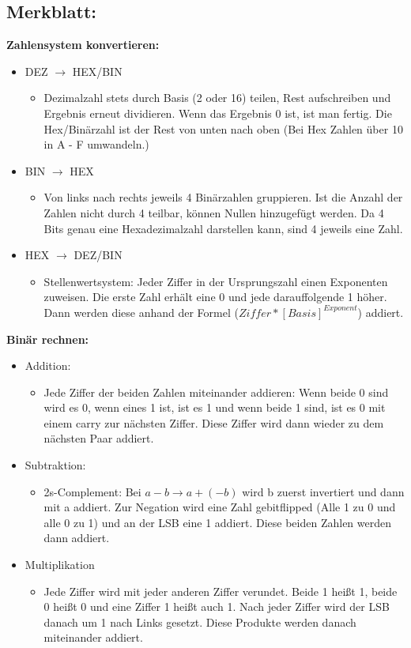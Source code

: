 \documentclass{article}
\begin{document}
		\subsection{Merkblatt:}
		\textbf{Zahlensystem konvertieren:}
		\begin{itemize}
			\item{DEZ $\to$ HEX/BIN}
			\begin{itemize}
				\item{Dezimalzahl stets durch Basis (2 oder 16) teilen, Rest aufschreiben und Ergebnis erneut dividieren. Wenn das Ergebnis 0 ist, ist man fertig. Die Hex/Binärzahl ist der Rest von unten nach oben (Bei Hex Zahlen über 10 in A - F umwandeln.)}
			\end{itemize}
			\item{BIN $\to$ HEX}
			\begin{itemize}
				\item{Von links nach rechts jeweils 4 Binärzahlen gruppieren. Ist die Anzahl der Zahlen nicht durch 4 teilbar, können Nullen hinzugefügt werden. Da 4 Bits genau eine Hexadezimalzahl darstellen kann, sind 4 jeweils eine Zahl.}
			\end{itemize}
			\item{HEX $\to$ DEZ/BIN}
			\begin{itemize}
				\item{Stellenwertsystem: Jeder Ziffer in der Ursprungszahl einen Exponenten zuweisen. Die erste Zahl erhält eine 0 und jede darauffolgende 1 höher. Dann werden diese anhand der Formel ($Ziffer * [Basis]^{Exponent}$) addiert.}
			\end{itemize}
		\end{itemize}
		\textbf{Binär rechnen:}
		\begin{itemize}
			\item{Addition:}
			\begin{itemize}
				\item{Jede Ziffer der beiden Zahlen miteinander addieren: Wenn beide 0 sind wird es 0, wenn eines 1 ist, ist es 1 und wenn beide 1 sind, ist es 0 mit einem carry zur nächsten Ziffer. Diese Ziffer wird dann wieder zu dem nächsten Paar addiert.}
			\end{itemize}
			\item{Subtraktion:}
			\begin{itemize}
				\item{2s-Complement: Bei $a-b \to a+(-b)$ wird b zuerst invertiert und dann mit a addiert. Zur Negation wird eine Zahl gebitflipped (Alle 1 zu 0 und alle 0 zu 1) und an der LSB eine 1 addiert. Diese beiden Zahlen werden dann addiert.}
			\end{itemize}
			\item{Multiplikation}
			\begin{itemize}
				\item{Jede Ziffer wird mit jeder anderen Ziffer verundet. Beide 1 heißt 1, beide 0 heißt 0 und eine Ziffer 1 heißt auch 1. Nach jeder Ziffer wird der LSB danach um 1 nach Links gesetzt. Diese Produkte werden danach miteinander addiert.}
			\end{itemize}
		\end{itemize}
		\newpage
\end{document}
